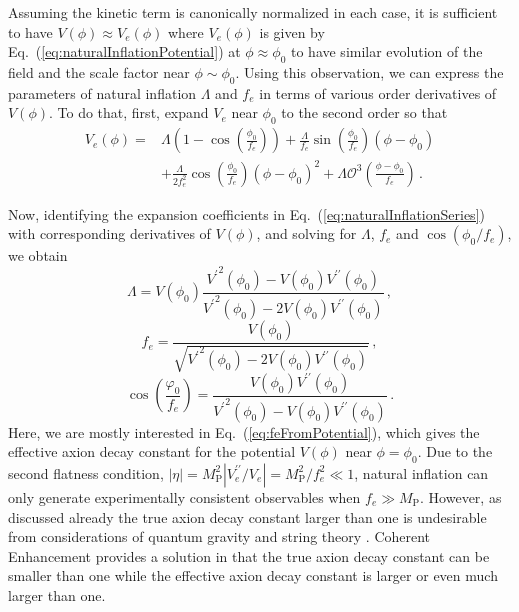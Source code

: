 \documentclass[12pt]{article}
\begin{document}
Assuming the kinetic term is canonically normalized in each case, it is sufficient to have $V\left(\phi\right) \approx V_{e}\left(\phi\right)$ where $V_{e}\left(\phi\right)$ is given by Eq.~(\ref{eq:naturalInflationPotential}) at $\phi \approx \phi_0$ to have similar evolution of the field and the scale factor near $\phi \sim \phi_0$.
Using this observation, we can express the parameters of natural inflation $\Lambda$ and $f_e$ in terms of various order derivatives of $V\left(\phi\right)$.
To do that, first, expand $V_{e}$ near $\phi_0$ to the second order so that
\begin{equation} \label{eq:naturalInflationSeries}
  \begin{aligned}
    V_{e}\left(\phi\right) =
      &\Lambda \left(1 - \cos\left(\frac{\phi_0}{f_e}\right)\right)
        + \frac{\Lambda}{f_e} \sin\left(\frac{\phi_0}{f_e}\right) \left(\phi - \phi_0\right)\\
      & + \frac{\Lambda}{2 f_e^2} \cos\left(\frac{\phi_0}{f_e}\right) \left(\phi - \phi_0\right)^2
        + \Lambda \mathcal{O}^3\left(\frac{\phi - \phi_0}{f_e}\right)\,.
  \end{aligned}
\end{equation}

Now, identifying the expansion coefficients in Eq.~(\ref{eq:naturalInflationSeries}) with corresponding derivatives of $V\left(\phi\right)$, and solving for $\Lambda$, $f_e$ and $\cos\left(\phi_0 / f_e\right)$, we obtain
\begin{equation} \label{eq:lambdaFromPotential}
  \Lambda = V\left(\phi_0\right) \frac
    {{V^\prime}^2\left(\phi_0\right) - V\left(\phi_0\right) V^{\prime\prime}\left(\phi_0\right)}
    {{V^\prime}^2\left(\phi_0\right) - 2 V\left(\phi_0\right) V^{\prime\prime}\left(\phi_0\right)}
  \,,
\end{equation}
\begin{equation} \label{eq:feFromPotential}
  f_e = \frac
    {V\left(\phi_0\right)}
    {\sqrt{{V^\prime}^2\left(\phi_0\right)
      - 2 V\left(\phi_0\right) V^{\prime\prime}\left(\phi_0\right)}}\,,
\end{equation}
\begin{equation} \label{eq:fieldInitialFromPotential}
  \cos\left(\frac{\varphi_0}{f_e}\right) = \frac
    {V\left(\phi_0\right) V^{\prime\prime}\left(\phi_0\right)}
    {{V^\prime}^2\left(\phi_0\right) - V\left(\phi_0\right) V^{\prime\prime}\left(\phi_0\right)}\,.
\end{equation}
Here, we are mostly interested in Eq.~(\ref{eq:feFromPotential}), which gives the effective axion decay constant for the potential $V\left(\phi\right)$ near $\phi = \phi_0$.
Due to the second flatness condition, $\left|\eta\right| = M_\text{P}^2 \left|V_e^{\prime\prime} / V_e\right| = M_\text{P}^2 / f_e^2 \ll 1$, natural inflation can only generate experimentally consistent observables when $f_e \gg M_\text{P}$.
However, as discussed already the true axion decay constant larger than one is undesirable from considerations of quantum gravity and string theory \cite{Kallosh:1995hi, Banks:2003sx}.
Coherent Enhancement provides a solution in that the true axion decay constant can be smaller than one while the effective axion decay constant is larger or even much larger than one.
\end{document}

